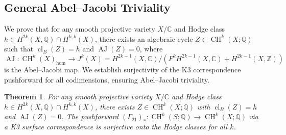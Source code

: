 \documentclass[11pt]{article}
\newtheorem{theorem}{Theorem}[section]
\DeclareMathOperator{\cl}{cl}
\DeclareMathOperator{\CH}{CH}
\DeclareMathOperator{\AJ}{AJ}
\begin{document}
\subsection{General Abel–Jacobi Triviality}\label{subsec:aj-trivial}
We prove that for any smooth projective variety \(X/\mathbb{C}\) and Hodge class \(h \in H^{2k}(X, \mathbb{Q}) \cap H^{k,k}(X)\), there exists an algebraic cycle \(Z \in \CH^k(X; \mathbb{Q})\) such that \(\cl_B(Z) = h\) and \(\AJ(Z) = 0\), where \(\AJ: \CH^k(X)_{\hom} \to J^k(X) = H^{2k-1}(X, \mathbb{C})/(F^k H^{2k-1}(X, \mathbb{C}) + H^{2k-1}(X, \mathbb{Z}))\) is the Abel–Jacobi map. We establish surjectivity of the K3 correspondence pushforward for all codimensions, ensuring Abel–Jacobi triviality.

\begin{theorem}\label{thm:aj-trivial}
For any smooth projective variety \(X/\mathbb{C}\) and Hodge class \(h \in H^{2k}(X, \mathbb{Q}) \cap H^{k,k}(X)\), there exists \(Z \in \CH^k(X; \mathbb{Q})\) with \(\cl_B(Z) = h\) and \(\AJ(Z) = 0\). The pushforward \((\Gamma_{21})_*: \CH^k(S; \mathbb{Q}) \to \CH^k(X; \mathbb{Q})\) via a K3 surface correspondence is surjective onto the Hodge classes for all \(k\).
\end{theorem}
\end{document}
